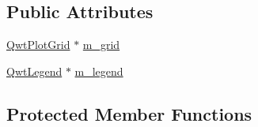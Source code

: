 \subsection*{Public Attributes}
\begin{DoxyCompactItemize}
\item 
\hyperlink{class_qwt_plot_grid}{Qwt\-Plot\-Grid} $\ast$ \hyperlink{group__scopeplugin_gaccb00d0e9720797980ac9f03c545e756}{m\-\_\-grid}
\item 
\hyperlink{class_qwt_legend}{Qwt\-Legend} $\ast$ \hyperlink{group__scopeplugin_ga2ee6ef41538d48a8d6f653765bcb80a6}{m\-\_\-legend}
\end{DoxyCompactItemize}
\subsection*{Protected Member Functions}
